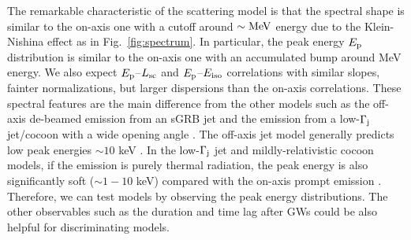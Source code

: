 \documentclass{emulateapj}
\begin{document}
The remarkable characteristic of the scattering model is that 
the spectral shape is similar to the on-axis one with a cutoff around $\sim {\rm MeV}$ energy
due to the Klein-Nishina effect as in Fig.~\ref{fig:spectrum}.
In particular, the peak energy $E_{\rm p}$ distribution is similar to the on-axis one
with an accumulated bump around MeV energy.
We also expect $E_{\rm p}$--$L_{\rm sc}$ and $E_{\rm p}$--$E_{\rm iso}$
correlations with similar slopes, fainter normalizations, 
but larger dispersions than the on-axis correlations.
These spectral features are the main difference from the other models 
such as the off-axis de-beamed emission from an sGRB jet \citep[e.g., ][]{2017arXiv171005905I}
and the emission from a low-$\Gamma_{\rm j}$ jet/cocoon with a wide opening angle
\citep[e.g., ][]{2017MNRAS.472.4953L, 2018MNRAS.473L.121K, 2017MNRAS.471.1652L, 2017ApJ...848L...6L}.
The off-axis jet model generally predicts low peak energies $\sim10$ keV \citep[e.g.,][]{2001ApJ...554L.163I, 2017arXiv171005905I}.
In the low-$\Gamma_{\rm j}$ jet and mildly-relativistic cocoon models, 
if the emission is purely thermal radiation, 
the peak energy is also significantly soft ($\sim1-10$ keV) compared with the on-axis prompt emission \citep{2017ApJ...848L...6L}.
Therefore, we can test models by observing the peak energy distributions.
The other observables such as the duration and time lag after GWs
could be also helpful for discriminating models.
\end{document}
